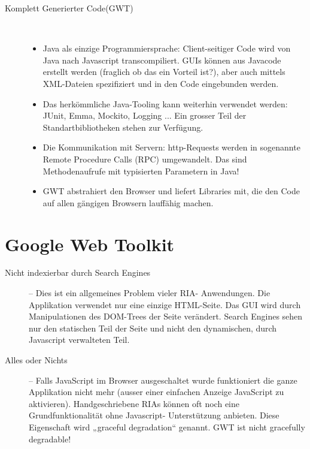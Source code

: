 \documentclass[a4paper,10pt]{scrreprt}
\begin{document}
\begin{description}
\begin{description}
\end{description}
\item[Komplett Generierter Code(GWT)] \hfill \\
\begin{itemize}
 \item Java als einzige Programmiersprache:
\subitem Client-seitiger Code wird von Java nach Javascript transcompiliert.
\subitem GUIs können aus Javacode erstellt werden (fraglich ob das ein Vorteil ist?), aber
auch mittels XML-Dateien spezifiziert und in den Code eingebunden werden.
\item Das herkömmliche Java-Tooling kann weiterhin verwendet werden:
\subitem JUnit, Emma, Mockito, Logging ...
\subitem Ein grosser Teil der Standartbibliotheken stehen zur Verfügung.
\item Die Kommunikation mit Servern: http-Requests werden in sogenannte Remote Procedure
Calls (RPC) umgewandelt. Das sind Methodenaufrufe mit typisierten Parametern in Java!
\item GWT abstrahiert den Browser und liefert Libraries mit, die den Code auf allen gängigen
Browsern lauffähig machen.
\end{itemize}

\end{description}

\section{Google Web Toolkit}
\begin{description}
 \item [Nicht indexierbar durch Search Engines] – Dies ist ein allgemeines Problem vieler RIA-
Anwendungen. Die Applikation verwendet nur eine einzige HTML-Seite. Das GUI wird durch
Manipulationen des DOM-Trees der Seite verändert. Search Engines sehen nur den
statischen Teil der Seite und nicht den dynamischen, durch Javascript verwalteten Teil.
\item[Alles oder Nichts] – Falls JavaScript im Browser ausgeschaltet wurde funktioniert die ganze
Applikation nicht mehr (ausser einer einfachen Anzeige JavaScript zu aktivieren).
Handgeschriebene RIAs können oft noch eine Grundfunktionalität ohne Javascript-
Unterstützung anbieten. Diese Eigenschaft wird „graceful degradation“ genannt. GWT ist
nicht gracefully degradable!
\end{description}
\end{document}

